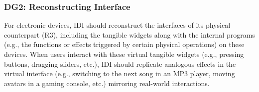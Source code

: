 
\subsubsection{\textbf{DG2: Reconstructing Interface}}
For electronic devices, IDI should reconstruct the interfaces of its physical counterpart (R3), including the tangible widgets along with the internal programs (e.g., the functions or effects triggered by certain physical operations) on these devices. 
When users interact with these virtual tangible widgets (e.g., pressing buttons, dragging sliders, etc.), IDI should replicate analogous effects in the virtual interface (e.g., switching to the next song in an MP3 player, moving avatars in a gaming console, etc.) mirroring real-world interactions. 






